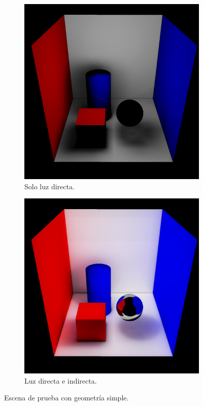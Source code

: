\begin{figure}[H]
	\centering
	  \begin{subfigure}{0.49\textwidth}
	      \centering
	  \includegraphics[width=\textwidth]{cornell-box-direct.png}
	      \caption{Solo luz directa.}
	  \end{subfigure}
	  \begin{subfigure}{0.49\textwidth}
	      \centering
	  \includegraphics[width=\textwidth]{cornell-box-full.png}
	      \caption{Luz directa e indirecta.}
	  \end{subfigure}
	\caption{Escena de prueba con geometría simple.}
	\label{fig:cornell-box-full}
\end{figure}

